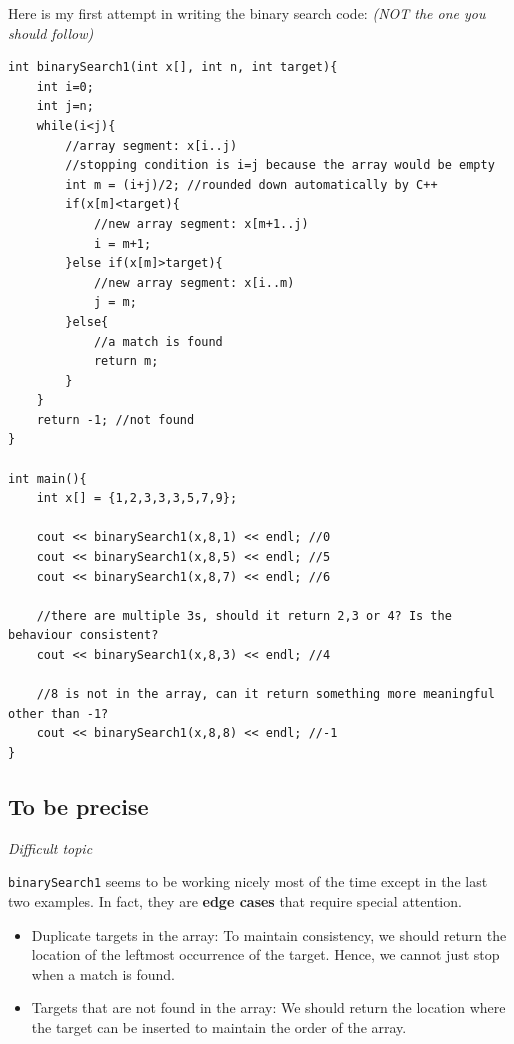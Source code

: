 Here is my first attempt in writing the binary search code: \textit{(NOT the one you should follow)}

\begin{lstlisting}
int binarySearch1(int x[], int n, int target){
    int i=0;
    int j=n;
    while(i<j){
        //array segment: x[i..j)
        //stopping condition is i=j because the array would be empty
        int m = (i+j)/2; //rounded down automatically by C++
        if(x[m]<target){
            //new array segment: x[m+1..j)
            i = m+1;
        }else if(x[m]>target){
            //new array segment: x[i..m)
            j = m;
        }else{
            //a match is found
            return m;
        }
    }
    return -1; //not found
}

int main(){
    int x[] = {1,2,3,3,3,5,7,9};
 
    cout << binarySearch1(x,8,1) << endl; //0
    cout << binarySearch1(x,8,5) << endl; //5
    cout << binarySearch1(x,8,7) << endl; //6

    //there are multiple 3s, should it return 2,3 or 4? Is the behaviour consistent?
    cout << binarySearch1(x,8,3) << endl; //4

    //8 is not in the array, can it return something more meaningful other than -1?
    cout << binarySearch1(x,8,8) << endl; //-1
}
\end{lstlisting}

\pagebreak

\subsection*{To be precise}

\textit{Difficult topic}


\texttt{binarySearch1} seems to be working nicely most of the time except in the last two examples. In fact, they are \textbf{edge cases} that require special attention. 

\begin{itemize}
    \item Duplicate targets in the array: To maintain consistency, we should return the location of the leftmost occurrence of the target. Hence, we cannot just stop when a match is found.
    \item Targets that are not found in the array: We should return the location where the target can be inserted to maintain the order of the array. 
\end{itemize}


